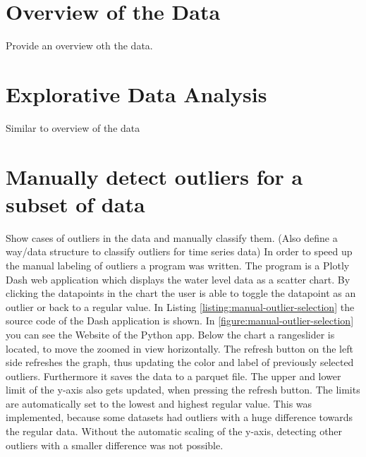 \section{Overview of the Data}

Provide an overview oth the data.
\section{Explorative Data Analysis}
Similar to overview of the data
\section{Manually detect outliers for a subset of data}
Show cases of outliers in the data and manually classify them. (Also define a way/data structure to classify outliers for time series data) 
\newline
\newline
In order to speed up the manual labeling of outliers a program was written. The program is a Plotly  Dash web application which displays the water level data as a scatter chart. 
By clicking the datapoints in the chart the user is able to toggle the datapoint as an outlier or back to a regular value. 
In Listing \ref{listing:manual-outlier-selection} the source code of the Dash application is shown. 
In \ref{figure:manual-outlier-selection} you can see the Website of the Python app. Below the chart a rangeslider is located, to move the zoomed in view horizontally. 
The refresh button on the left side refreshes the graph, thus updating the color and label of previously selected outliers. Furthermore it saves the data to a parquet file.
The upper and lower limit of the y-axis also gets updated, when pressing the refresh button. 
The limits are automatically set to the lowest and highest regular value. 
This was implemented, because some datasets had outliers with a huge difference towards the regular data. 
Without the automatic scaling of the y-axis, detecting other outliers with a smaller difference was not possible.
